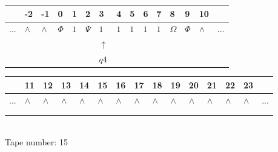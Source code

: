 \documentclass[11pt]{article}
\begin{document}
\begin{table}[H]
\centering
\begin{tabular}{lllllllllllllll}
 & -2 & -1 & 0 & 1 & 2 & 3 & 4 & 5 & 6 & 7 & 8 & 9 & 10 & \\
\hline
$...$ & \multicolumn{1}{|l|}{$\wedge$} & \multicolumn{1}{|l|}{$\wedge$} & \multicolumn{1}{|l|}{$\Phi$} & \multicolumn{1}{|l|}{$1$} & \multicolumn{1}{|l|}{$\Psi$} & \multicolumn{1}{|l|}{$1$} & \multicolumn{1}{|l|}{$1$} & \multicolumn{1}{|l|}{$1$} & \multicolumn{1}{|l|}{$1$} & \multicolumn{1}{|l|}{$1$} & \multicolumn{1}{|l|}{$\Omega$} & \multicolumn{1}{|l|}{$\Phi$} & \multicolumn{1}{|l|}{$\wedge$} & $...$\\
\hline
&  &  &  &  &  & $\uparrow$ &  &  &  &  &  &  &  &  \\
&  &  &  &  &  & $ q4 $ &  &  &  &  &  &  &  &  \\
\end{tabular}
\begin{tabular}{lllllllllllllll}
 & 11 & 12 & 13 & 14 & 15 & 16 & 17 & 18 & 19 & 20 & 21 & 22 & 23 & \\
\hline
$...$ & \multicolumn{1}{|l|}{$\wedge$} & \multicolumn{1}{|l|}{$\wedge$} & \multicolumn{1}{|l|}{$\wedge$} & \multicolumn{1}{|l|}{$\wedge$} & \multicolumn{1}{|l|}{$\wedge$} & \multicolumn{1}{|l|}{$\wedge$} & \multicolumn{1}{|l|}{$\wedge$} & \multicolumn{1}{|l|}{$\wedge$} & \multicolumn{1}{|l|}{$\wedge$} & \multicolumn{1}{|l|}{$\wedge$} & \multicolumn{1}{|l|}{$\wedge$} & \multicolumn{1}{|l|}{$\wedge$} & \multicolumn{1}{|l|}{$\wedge$} & $...$\\
\hline
&  &  &  &  &  &  &  &  &  &  &  &  &  &  \\
&  &  &  &  &  &  &  &  &  &  &  &  &  &  \\
\end{tabular}
\\
Tape number: 15
\noindent\makebox[\linewidth]{\hdashrule{\textwidth}{1pt}{1pt}}\end{table}
\clearpage
\end{document}
